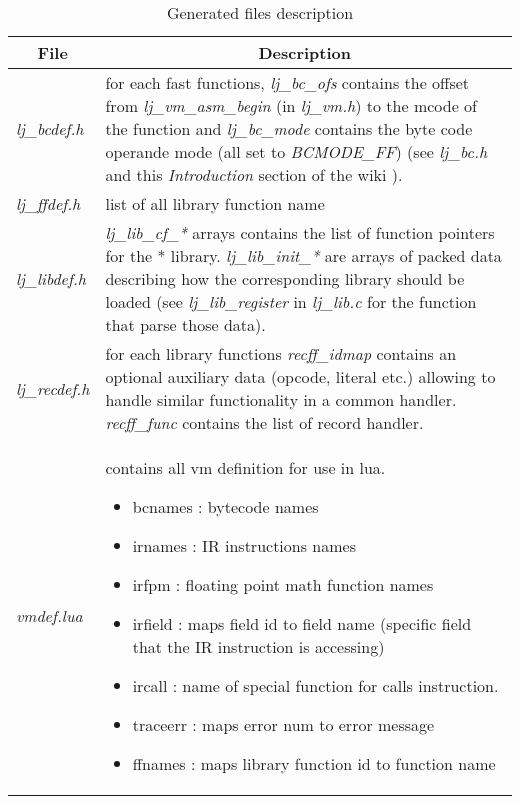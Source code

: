 \begin{table}[H]
\centering
\caption{Generated files description}
\label{tab:library-generated-files}
\begin{tabularx}{\textwidth}{|l|X|}
\hline
\multicolumn{1}{|c|}{File}          & \multicolumn{1}{c|}{Description}                      \\\hline
\emph{lj\_bcdef.h}                  &
  for each fast functions, \emph{lj\_bc\_ofs} contains the offset from
  \emph{lj\_vm\_asm\_begin} (in \emph{lj\_vm.h}) to the mcode of the function
  and \emph{lj\_bc\_mode} contains the byte code operande mode (all set to
  \emph{BCMODE\_FF}) (see \emph{lj\_bc.h} and this \emph{Introduction} section
  of the wiki \cite{luajit-bc}).                                                            \\\hline
\emph{lj\_ffdef.h}                  & list of all library function name                     \\\hline
\emph{lj\_libdef.h}                 &
  \emph{lj\_lib\_cf\_*} arrays contains the list of function pointers for the
  * library. \emph{lj\_lib\_init\_*} are arrays of packed data describing how
  the corresponding library should be loaded (see \emph{lj\_lib\_register} in
  \emph{lj\_lib.c} for the function that parse those data).                                 \\\hline
\emph{lj\_recdef.h}                 &
  for each library functions \emph{recff\_idmap} contains an optional auxiliary
  data (opcode, literal etc.) allowing to handle similar functionality in a
  common handler. \emph{recff\_func} contains the list of record handler.                   \\\hline
\emph{vmdef.lua}                    &
  contains all vm definition for use in lua.
  \begin{itemize}
  \item bcnames  : bytecode names
  \item irnames  : IR instructions names
  \item irfpm    : floating point math function names
  \item irfield  : maps field id to field name (specific field that the IR instruction is accessing)
  \item ircall   : name of special function for calls instruction.
  \item traceerr : maps error num to error message
  \item ffnames  : maps library function id to function name
  \end{itemize}                                                                             \\\hline
\end{tabularx}
\end{table}
